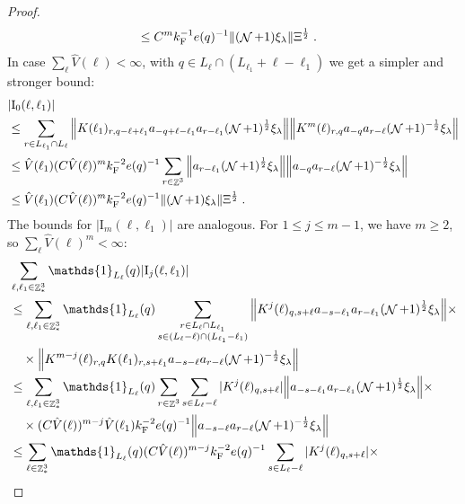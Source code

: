 \documentclass[12pt,a4paper]{article}
\numberwithin{equation}{section}
\newcommand{\1}{\mathbb{I}}
\newcommand{\F}{\mathrm{F}}
\newcommand{\I}{\mathrm{I}}
\DeclareMathOperator{\Z}{\mathbb{Z}}
\DeclareMathOperator{\NN}{\mathcal{N}}
\newcommand{\half}{\frac{1}{2}}
\theoremstyle{plain}
\theoremstyle{definition}
\theoremstyle{remark}
\theoremstyle{plain}
\theoremstyle{definition}
\theoremstyle{remark}
\begin{document}
\begin{proof}
{\begin{align}
	&\leq C^m k_{\F}^{-1} e(q)^{-1}
		\norm{ (\NN+1) \xi_\lambda} \Xi^{\half} \;. \label{eq:estEQ2131_Coulomb}
\end{align}
In case $ \sum_\ell \hat{V}(\ell) < \infty $, with $ q \in L_\ell \cap (L_{\ell_1}+\ell-\ell_1) $ we get a simpler and stronger bound:
\begin{align}
	&|\I_0(\ell, \ell_1)| \nonumber\\
	&\leq \sum\limits_{r\in L_{\ell_1} \cap L_\ell}
		\norm{ K(\ell_1)_{r,q-\ell+\ell_1} a_{-q+\ell-\ell_1} a_{r-\ell_1} (\NN+1)^{\half} \xi_\lambda}
		\norm{ K^m(\ell)_{r,q} a_{-q}a_{r-\ell} (\NN+1)^{-\half} \xi_\lambda } \nonumber\\
	&\leq \hat{V}(\ell_1) (C \hat{V}(\ell))^m k_{\F}^{-2} e(q)^{-1}
	\sum\limits_{r\in \Z^3} \norm{ a_{r-\ell_1} (\NN+1)^{\half} \xi_\lambda}
		\norm{a_{-q}a_{r-\ell} (\NN+1)^{-\half} \xi_\lambda } \nonumber\\
	&\leq \hat{V}(\ell_1) (C \hat{V}(\ell))^m k_{\F}^{-2} e(q)^{-1} \norm{ (\NN+1) \xi_\lambda} \Xi^\half \;. \label{eq:estEQ2131}
\end{align}
}
The bounds for $ |\I_m(\ell, \ell_1)| $ are analogous. For $ 1 \le j \le m-1 $, we have $ m \ge 2 $, so $ \sum_\ell \hat{V}(\ell)^m < \infty $:
\textcolor{green!30!black}{
\begin{align}
	&\sum_{\ell,\ell_1 \in \Z^3_*} \mathds{1}_{L_\ell}(q) |\I_j(\ell, \ell_1)| \nonumber\\
	&\leq \sum_{\ell,\ell_1 \in \Z^3_*} \mathds{1}_{L_\ell}(q) \sum\limits_{\substack{r\in L_{\ell} \cap L_{\ell_1}\\ s \in (L_{\ell} - \ell) \cap (L_{\ell_1} - \ell_1)}}
		\norm{ K^{j}(\ell)_{q,s+\ell} a_{-s-\ell_1} a_{r-\ell_1} (\NN+1)^{\half} \xi_\lambda} \nonumber \times \\ 
	&\quad \times \norm{ K^{m-j}(\ell)_{r,q} K(\ell_1)_{r,s+\ell_1} a_{-s-\ell}a_{r-\ell} (\NN+1)^{-\half} \xi_\lambda } \nonumber\\
	&\leq \sum_{\ell,\ell_1 \in \Z^3_*} \mathds{1}_{L_\ell}(q)
		\sum_{r\in \Z^3} \sum_{s \in L_{\ell} - \ell}
		|K^{j}(\ell)_{q,s+\ell}|
		\norm{ a_{-s-\ell_1} a_{r-\ell_1} (\NN+1)^{\half} \xi_\lambda} \times \nonumber\\
	&\quad \times (C \hat{V}(\ell))^{m-j} \hat{V}(\ell_1) k_{\F}^{-2} e(q)^{-1}
		\norm{ a_{-s-\ell}a_{r-\ell} (\NN+1)^{-\half} \xi_\lambda } \nonumber\\
	&\leq \sum_{\ell \in \Z^3_*} \mathds{1}_{L_\ell}(q) (C \hat{V}(\ell))^{m-j} k_{\F}^{-2} e(q)^{-1}
		\sum_{s \in L_{\ell} - \ell}
		|K^{j}(\ell)_{q,s+\ell}| \times \nonumber\\

\end{align}}
\end{proof}
\end{document}
